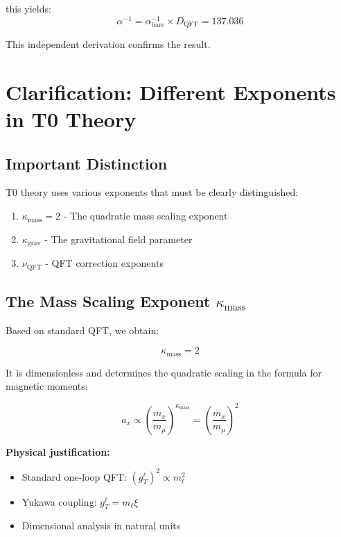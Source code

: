\documentclass[12pt,a4paper]{article}
\begin{document}
	this yields:
	\begin{equation}
		\alpha^{-1} = \alpha_{\text{bare}}^{-1} \times D_{\text{QFT}} = 137.036
	\end{equation}
	
	This independent derivation confirms the result.
	
	\section{Clarification: Different Exponents in T0 Theory}
	
	\subsection{Important Distinction}
	
	T0 theory uses various exponents that must be clearly distinguished:
	
	\begin{enumerate}
		\item $\kappa_{\text{mass}} = 2$ - The quadratic mass scaling exponent
		\item $\kappa_{\text{grav}}$ - The gravitational field parameter
		\item $\nu_{\text{QFT}}$ - QFT correction exponents
	\end{enumerate}
	
	\subsection{The Mass Scaling Exponent $\kappa_{\text{mass}}$}
	
	Based on standard QFT, we obtain:
	
	\begin{equation}
		\kappa_{\text{mass}} = 2
	\end{equation}
	
	It is dimensionless and determines the quadratic scaling in the formula for magnetic moments:
	
	\begin{equation}
		a_x \propto \left(\frac{m_x}{m_\mu}\right)^{\kappa_{\text{mass}}} = \left(\frac{m_x}{m_\mu}\right)^{2}
	\end{equation}
	
	\textbf{Physical justification:}
	\begin{itemize}
		\item Standard one-loop QFT: $(g_T^\ell)^2 \propto m_\ell^2$
		\item Yukawa coupling: $g_T^\ell = m_\ell \xi$
		\item Dimensional analysis in natural units
	\end{itemize}
	
\end{document}
